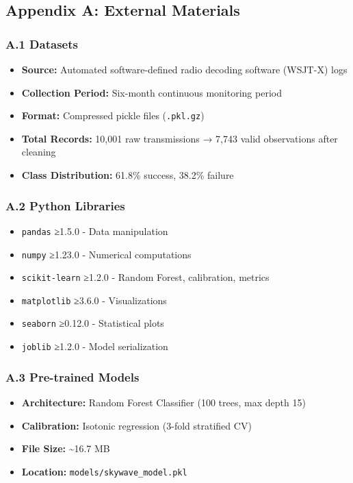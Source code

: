 \subsection{Appendix A: External
Materials}\label{appendix-a-external-materials}

\subsubsection{A.1 Datasets}\label{a.1-datasets}

\begin{itemize}
\tightlist
\item
  \textbf{Source:} Automated software-defined radio decoding software
  (WSJT-X) logs
\item
  \textbf{Collection Period:} Six-month continuous monitoring period
\item
  \textbf{Format:} Compressed pickle files (\texttt{.pkl.gz})
\item
  \textbf{Total Records:} 10,001 raw transmissions → 7,743 valid
  observations after cleaning
\item
  \textbf{Class Distribution:} 61.8\% success, 38.2\% failure
\end{itemize}

\subsubsection{A.2 Python Libraries}\label{a.2-python-libraries}

\begin{itemize}
\tightlist
\item
  \texttt{pandas} ≥1.5.0 - Data manipulation
\item
  \texttt{numpy} ≥1.23.0 - Numerical computations
\item
  \texttt{scikit-learn} ≥1.2.0 - Random Forest, calibration, metrics
\item
  \texttt{matplotlib} ≥3.6.0 - Visualizations
\item
  \texttt{seaborn} ≥0.12.0 - Statistical plots
\item
  \texttt{joblib} ≥1.2.0 - Model serialization
\end{itemize}

\subsubsection{A.3 Pre-trained Models}\label{a.3-pre-trained-models}

\begin{itemize}
\tightlist
\item
  \textbf{Architecture:} Random Forest Classifier (100 trees, max depth
  15)
\item
  \textbf{Calibration:} Isotonic regression (3-fold stratified CV)
\item
  \textbf{File Size:} \textasciitilde16.7 MB
\item
  \textbf{Location:} \texttt{models/skywave\_model.pkl}
\end{itemize}

